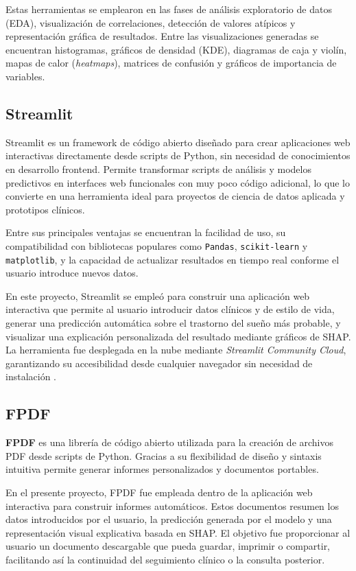 Estas herramientas se emplearon en las fases de análisis exploratorio de datos (EDA), visualización de correlaciones, detección de valores atípicos y representación gráfica de resultados. Entre las visualizaciones generadas se encuentran histogramas, gráficos de densidad (KDE), diagramas de caja y violín, mapas de calor (\textit{heatmaps}), matrices de confusión y gráficos de importancia de variables.


\subsection{Streamlit}

Streamlit es un framework de código abierto diseñado para crear aplicaciones web interactivas directamente desde scripts de Python, sin necesidad de conocimientos en desarrollo frontend. Permite transformar scripts de análisis y modelos predictivos en interfaces web funcionales con muy poco código adicional, lo que lo convierte en una herramienta ideal para proyectos de ciencia de datos aplicada y prototipos clínicos.

Entre sus principales ventajas se encuentran la facilidad de uso, su compatibilidad con bibliotecas populares como \texttt{Pandas}, \texttt{scikit-learn} y \texttt{matplotlib}, y la capacidad de actualizar resultados en tiempo real conforme el usuario introduce nuevos datos.

En este proyecto, Streamlit se empleó para construir una aplicación web interactiva que permite al usuario introducir datos clínicos y de estilo de vida, generar una predicción automática sobre el trastorno del sueño más probable, y visualizar una explicación personalizada del resultado mediante gráficos de SHAP. La herramienta fue desplegada en la nube mediante \textit{Streamlit Community Cloud}, garantizando su accesibilidad desde cualquier navegador sin necesidad de instalación \cite{streamlit}.


\subsection{FPDF}
\textbf{FPDF} es una librería de código abierto utilizada para la creación de archivos PDF desde scripts de Python. Gracias a su flexibilidad de diseño y sintaxis intuitiva permite generar informes personalizados y documentos portables.

En el presente proyecto, FPDF fue empleada dentro de la aplicación web interactiva para construir informes automáticos. Estos documentos resumen los datos introducidos por el usuario, la predicción generada por el modelo y una representación visual explicativa basada en SHAP. El objetivo fue proporcionar al usuario un documento descargable que pueda guardar, imprimir o compartir, facilitando así la continuidad del seguimiento clínico o la consulta posterior.

